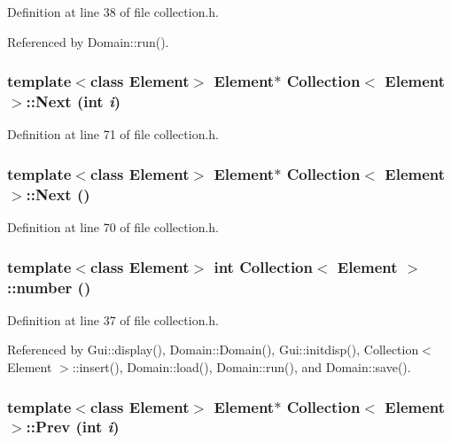 Definition at line 38 of file collection.h.

Referenced by Domain::run().\hypertarget{classCollection_83ab50404b4cab96cca07e314a93d829}{
\subsubsection[{Next}]{\setlength{\rightskip}{0pt plus 5cm}template$<$class Element$>$ Element$\ast$ {\bf Collection}$<$ Element $>$::Next (int {\em i})}}
\label{classCollection_83ab50404b4cab96cca07e314a93d829}




Definition at line 71 of file collection.h.\hypertarget{classCollection_8ffdd965b1d80ce385691cc1baffbfac}{
\subsubsection[{Next}]{\setlength{\rightskip}{0pt plus 5cm}template$<$class Element$>$ Element$\ast$ {\bf Collection}$<$ Element $>$::Next ()}}
\label{classCollection_8ffdd965b1d80ce385691cc1baffbfac}




Definition at line 70 of file collection.h.\hypertarget{classCollection_ad4dec45255eaf93f2652c06a7076119}{
\subsubsection[{number}]{\setlength{\rightskip}{0pt plus 5cm}template$<$class Element$>$ int {\bf Collection}$<$ Element $>$::number ()}}
\label{classCollection_ad4dec45255eaf93f2652c06a7076119}




Definition at line 37 of file collection.h.

Referenced by Gui::display(), Domain::Domain(), Gui::initdisp(), Collection$<$ Element $>$::insert(), Domain::load(), Domain::run(), and Domain::save().\hypertarget{classCollection_34e5aa5d88188ee145a34afd5da685cd}{
\subsubsection[{Prev}]{\setlength{\rightskip}{0pt plus 5cm}template$<$class Element$>$ Element$\ast$ {\bf Collection}$<$ Element $>$::Prev (int {\em i})}}
\label{classCollection_34e5aa5d88188ee145a34afd5da685cd}




